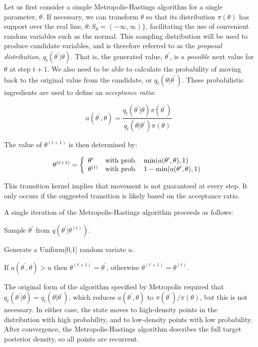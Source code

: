 \documentclass[]{book}
\begin{document}
Let us first consider a simple Metropolis-Hastings algorithm for a single parameter, $\theta$. If necessary, we can transform $\theta$ so that its distribution $\pi(\theta)$ has support over the real line, $\theta:S_{\theta} = (-\infty,\infty)\}$, facilitating the use of convenient random variables such as the normal. This sampling distribution will be used to produce candidate variables, and is therefore referred to as the \emph{proposal distribution}, $q_t(\theta^{\prime} | \theta)$. That is, the generated value, $\theta^{\prime}$, is a \emph{possible} next value for $\theta$ at step $t+1$. We also need to be able to calculate the probability of moving back to the original value from the candidate, or $q_t(\theta | \theta^{\prime})$. These probabilistic ingredients are used to define an \emph{acceptance ratio}:

\[
a(\theta^{\prime},\theta) = \frac{q_t(\theta^{\prime} | \theta) \pi(\theta^{\prime})}{q_t(\theta | \theta^{\prime}) \pi(\theta)}
\]

\noindent The value of $\theta^{(t+1)}$ is then determined by:

\[
\theta^{(t+1)} = \left\{\begin{array}{l@{\quad \mbox{with prob.} \quad}l}\theta^{\prime} & \min(a(\theta^{\prime},\theta),1) \\ \theta^{(t)} & 1 - \min(a(\theta^{\prime},\theta),1) \end{array}\right.
\]

\noindent This transition kernel implies that movement is not guaranteed at every step. It only occurs if the suggested transition is likely based on the acceptance ratio.

A single iteration of the Metropolis-Hastings algorithm proceeds as follows:

\begin{list}{}
{}
\item Sample $\theta^{\prime}$ from $q(\theta^{\prime} | \theta^{(t)})$.
\item Generate a Uniform[0,1] random variate $u$.
\item If $a(\theta^{\prime},\theta) > u$ then $\theta^{(t+1)} = \theta^{\prime}$, otherwise $\theta^{(t+1)} = \theta^{(t)}$.
\end{list}

\noindent The original form of the algorithm specified by Metropolis required that $q_t(\theta^{\prime} | \theta) = q_t(\theta | \theta^{\prime})$, which reduces $a(\theta^{\prime},\theta)$ to $\pi(\theta^{\prime})/\pi(\theta)$, but this is not necessary. In either case, the state moves to high-density points in the distribution with high probability, and to low-density points with low probability. After convergence, the Metropolis-Hastings algorithm describes the full target posterior density, so all points are recurrent.
\end{document}
